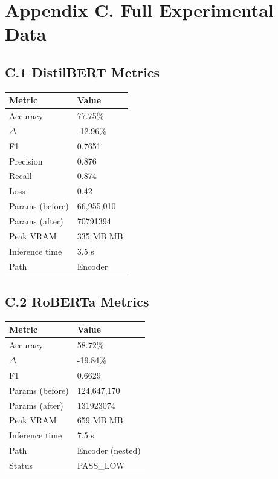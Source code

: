 
\section{Appendix C. Full Experimental Data}

\subsection{C.1 DistilBERT Metrics}

\begin{table}[H]
\centering
\small
\begin{tabular}{ll}
\toprule
\textbf{Metric} & \textbf{Value} \\
\midrule
Accuracy & 77.75\% \\
$\Delta$ & -12.96\% \\
F1 & 0.7651 \\
Precision & 0.876 \\
Recall & 0.874 \\
Loss & 0.42 \\
Params (before) & 66,955,010 \\
Params (after) & 70791394 \\
Peak VRAM & 335 MB MB \\
Inference time & 3.5 s \\
Path & Encoder \\
\bottomrule
\end{tabular}
\end{table}

\subsection{C.2 RoBERTa Metrics}

\begin{table}[H]
\centering
\small
\begin{tabular}{ll}
\toprule
\textbf{Metric} & \textbf{Value} \\
\midrule
Accuracy & 58.72\% \\
$\Delta$ & -19.84\% \\
F1 & 0.6629 \\
Params (before) & 124,647,170 \\
Params (after) & 131923074 \\
Peak VRAM & 659 MB MB \\
Inference time & 7.5 s \\
Path & Encoder (nested) \\
Status & PASS\_LOW \\
\bottomrule
\end{tabular}
\end{table}

